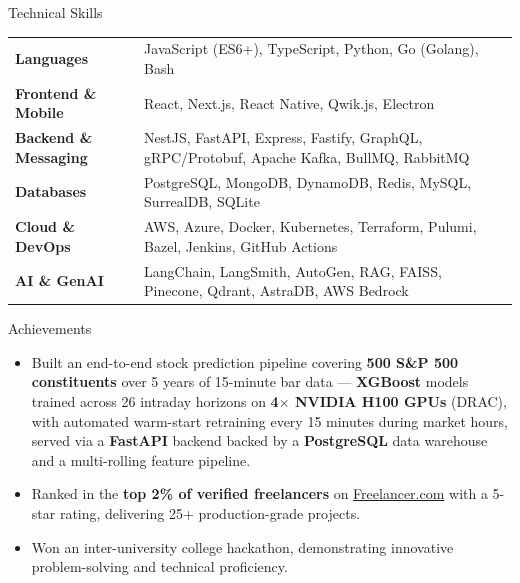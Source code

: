 \documentclass{resume}
\begin{document}
\begin{rSection}{Technical Skills}
\scriptsize
\begin{tabular}{ @{} >{\bfseries}l @{\hspace{1.5ex}} l }
Languages             & JavaScript (ES6+), TypeScript, Python, Go (Golang), Bash \\
Frontend \& Mobile    & React, Next.js, React Native, Qwik.js, Electron \\
Backend \& Messaging  & NestJS, FastAPI, Express, Fastify, GraphQL, gRPC/Protobuf, Apache Kafka, BullMQ, RabbitMQ \\
Databases             & PostgreSQL, MongoDB, DynamoDB, Redis, MySQL, SurrealDB, SQLite \\
Cloud \& DevOps       & AWS, Azure, Docker, Kubernetes, Terraform, Pulumi, Bazel, Jenkins, GitHub Actions \\
AI \& GenAI           & LangChain, LangSmith, AutoGen, RAG, FAISS, Pinecone, Qdrant, AstraDB, AWS Bedrock \\
\end{tabular}
\end{rSection}

\begin{rSection}{Achievements}
\scriptsize
\begin{itemize}\itemsep -7pt
    \item Built an end-to-end stock prediction pipeline covering \textbf{500 S\&P 500 constituents} over 5 years of 15-minute bar data --- \textbf{XGBoost} models trained across 26 intraday horizons on \textbf{4$\times$ NVIDIA H100 GPUs} (DRAC), with automated warm-start retraining every 15 minutes during market hours, served via a \textbf{FastAPI} backend backed by a \textbf{PostgreSQL} data warehouse and a multi-rolling feature pipeline.
    \item Ranked in the \textbf{top 2\% of verified freelancers} on \href{https://www.freelancer.com/u/misterharshkumar}{Freelancer.com} with a 5-star rating, delivering 25+ production-grade projects.
    \item Won an inter-university college hackathon, demonstrating innovative problem-solving and technical proficiency.
\end{itemize}
\end{rSection}
\end{document}
